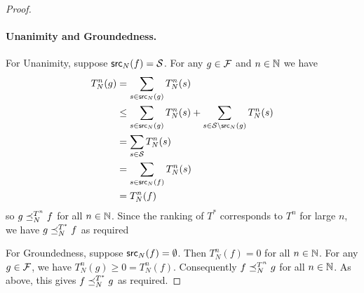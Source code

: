\begin{proof}
\paragraph{Unanimity and Groundedness.}
For Unanimity, suppose $\mathsf{src}_N(f) = \mathcal{S}$. For any $g \in \mathcal{F}$ and $n \in \mathbb{N}$ we
have
\begin{align*}
    T_N^n(g)
    &= \sum_{s \in \mathsf{src}_N(g)}{T_N^n(s)} \\
    &\le \sum_{s \in \mathsf{src}_N(g)}{T_N^n(s)} + \sum_{s \in \mathcal{S} \setminus \mathsf{src}_N(g)}{T_N^n(s)} \\
    &= \sum_{s \in \mathcal{S}}{T_N^n(s)} \\
    &= \sum_{s \in \mathsf{src}_N(f)}{T_N^n(s)} \\
    &= T_N^n(f)
\end{align*}
so $g \preceq_N^{T^n} f$ for all $n \in \mathbb{N}$. Since the ranking of $T^*$
corresponds to $T^n$ for large $n$, we have $g \preceq_N^{T^*} f$ as
required

For Groundedness, suppose $\mathsf{src}_N(f) = \emptyset$. Then $T_N^n(f) = 0$ for all $n
\in \mathbb{N}$. For any $g \in \mathcal{F}$, we have $T_N^n(g) \ge 0 = T_N^n(f)$.
Consequently $f \preceq_N^{T^n} g$ for all $n \in \mathbb{N}$. As above, this gives $f
\preceq_N^{T^*} g$ as required.
\end{proof}


